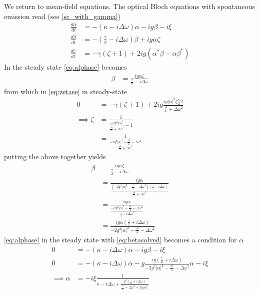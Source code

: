 We return to mean-field equations. The optical Bloch equations with spontaneous emission read (see \cref{sc_with_gamma})
\begin{align}
  \frac{d \alpha}{dt} &= -(\kappa - i \Delta \omega)\alpha - ig \beta - i\xi\label{eq:alphase}\\
  \frac{d \beta}{dt} &= -(\frac{\gamma}{2}-i\Delta\omega)\beta+ig\alpha\zeta \label{eq:betase}\\
  \frac{d\zeta}{dt} &= -\gamma (\zeta +1)+2ig(\alpha^*\beta-\alpha\beta^*) \label{eq:zetase}
\end{align}
In the steady state \cref{eq:alphase} becomes
\begin{align}
  \beta &= \frac{ig\alpha\zeta}{\frac{\gamma}{2}-i\Delta\omega}
\end{align}
from which in \cref{eq:zetase} in steady-state
\begin{align}
  0 &= -\gamma(\zeta+1)+2ig\frac{ig|\alpha|^2\zeta\frac{\gamma}{2}2}{\frac{\gamma^2}{4}+\Delta\omega^2} \\
  \implies \zeta &= \frac{1}{\frac{-2g^2|\alpha|^2}{\frac{\gamma^2}{4} +\Delta\omega^2}-1} \\
  &= \frac{1}{\frac{-2g^2|\alpha|^2 - \frac{\gamma^2}{4}-\Delta\omega^2}{\frac{\gamma^2}{4} +\Delta\omega^2}}
\end{align}
putting the above together yields
\begin{align}
  \beta &= \frac{ig\alpha\zeta}{\frac{\gamma}{2}-i\Delta\omega}\\
  &= \frac{ig\alpha}{\frac{(-2g^2|\alpha|^2-\frac{\gamma^2}{4}-\Delta\omega^2)(\frac{\gamma}{2}-i\Delta\omega)}{\frac{\gamma^2}{4}+\Delta\omega^2}}\\
  &= \frac{ig\alpha}{\frac{-2g^2|\alpha|^2-\frac{\gamma^2}{4}-\Delta\omega^2}{\frac{\gamma}{2}+i\Delta\omega^2}}\\
  &= \frac{ig\alpha(\frac{\gamma}{2}+i\Delta\omega)}{-2g^2|\alpha|^2-\frac{\gamma^2}{4}-\Delta\omega^2} \label{eq:betasolved}
\end{align}
\cref{eq:alphase} in the steady state with  \cref{eq:betasolved} becomes a condition for $\alpha$
\begin{align} %
  0&=-(\kappa-i\Delta\omega)\alpha-ig\beta-i\xi \\
  0&=-{(\kappa-i\Delta\omega)}\alpha-g\frac{ig(\frac{\gamma}{2}+i\Delta\omega)}{-2g^2|\alpha|^2-\frac{\gamma^2}{4}-\Delta\omega^2}\alpha-i\xi \\
\implies \alpha &= -i\xi \frac{1}{\kappa-i\Delta\omega+\frac{g^2(\frac{\gamma}{2}+i\Delta\omega)}{\frac{\gamma^2}{4}+{\Delta\omega}^2+2g{|\alpha|}^2}}\label{eq:alphadetdiss}
\end{align}

